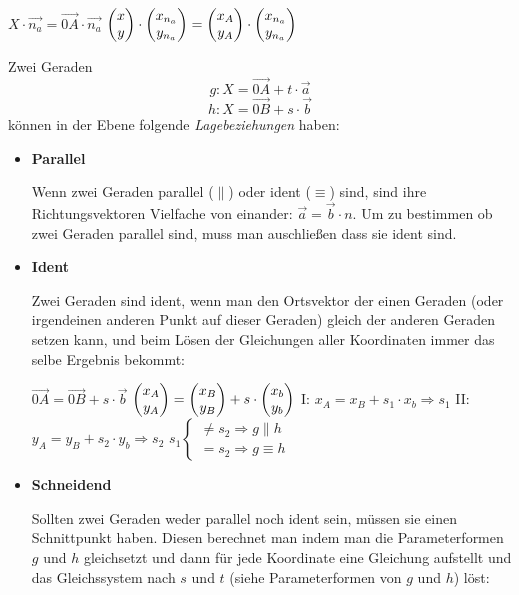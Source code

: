 \begin{center}
  $X \cdot \vec{n_{a}} = \vec{0A} \cdot \vec{n_{a}}$
  \extrapar
  $\begin{pmatrix}x\\y\end{pmatrix} \cdot \begin{pmatrix}x_{n_{a}}\\y_{n_{a}}\end{pmatrix} = \begin{pmatrix}x_{A} \\ y_{A}\end{pmatrix} \cdot \begin{pmatrix}x_{n_{a}}\\y_{n_{a}}\end{pmatrix}$
\end{center}


Zwei Geraden $$g: X = \vec{0A} + t \cdot \vec{a}$$ $$h: X = \vec{0B} + s \cdot \vec{b}$$ k\"{o}nnen in der Ebene folgende \emph{Lagebeziehungen} haben:

\begin{itemize}
  \item \textbf{Parallel}
  \par
  Wenn zwei Geraden parallel ($\parallel$) oder ident ($\equiv$) sind, sind ihre Richtungsvektoren Vielfache von einander: $\vec{a} = \vec{b} \cdot n$. Um zu bestimmen ob zwei Geraden parallel sind, muss man auschlie\ss{}en dass sie ident sind.

\pagebreak

  \item \textbf{Ident}
  \par
  Zwei Geraden sind ident, wenn man den Ortsvektor der einen Geraden (oder irgendeinen anderen Punkt auf dieser Geraden) gleich der anderen Geraden setzen kann, und beim L\"{o}sen der Gleichungen aller Koordinaten immer das selbe Ergebnis bekommt:

  \begin{center}
    $\vec{0A} = \vec{0B} + s \cdot \vec{b}$
    \extrapar
    $\begin{pmatrix}x_{A}\\y_{A}\end{pmatrix} = \begin{pmatrix}x_{B}\\y_{B}\end{pmatrix} + s \cdot \begin{pmatrix}x_{b}\\y_{b}\end{pmatrix}$
    \extrapar
    I: $x_{A} = x_{B} + s_{1} \cdot x_{b} \Rightarrow s_{1}$
    \extrapar
    II: $y_{A} = y_{B} + s_{2} \cdot y_{b} \Rightarrow s_{2}$
    \extrapar
    $
      s_{1}
      \begin{cases}
        \neq s_{2} \Rightarrow g \parallel h\\
        = s_{2} \Rightarrow g \equiv h
      \end{cases}
    $
  \end{center}

\item \textbf{Schneidend}
  \par
  Sollten zwei Geraden weder parallel noch ident sein, m\"{u}ssen sie einen Schnittpunkt haben. Diesen berechnet man indem man die Parameterformen $g$ und $h$ gleichsetzt und dann f\"{u}r jede Koordinate eine Gleichung aufstellt und das Gleichssystem nach $s$ und $t$ (siehe Parameterformen von $g$ und $h$) l\"{o}st:


\end{itemize}
